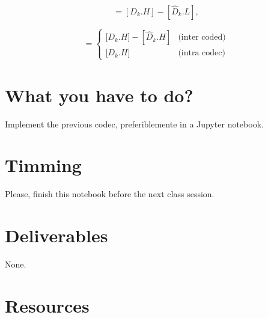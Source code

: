 \begin{equation}
  [E_k.H] = [D_k.H] - [\hat{D}_k.L],
  \tag{g}
\end{equation}

\begin{equation}
  [E_k.H] = \left\{
  \begin{array}{ll}
    {[}D_k.H{]} - [\hat{D}_k.H] & \text{(inter coded)} \\
    {[}D_k.H{]}                 & \text{(intra codec)}
  \end{array}
  \right.
  \tag{f}
\end{equation}

\section{What you have to do?}

Implement the previous codec, preferiblemente in a Jupyter notebook. 

\section{Timming}

Please, finish this notebook before the next class session.

\section{Deliverables}

None.

\section{Resources}


